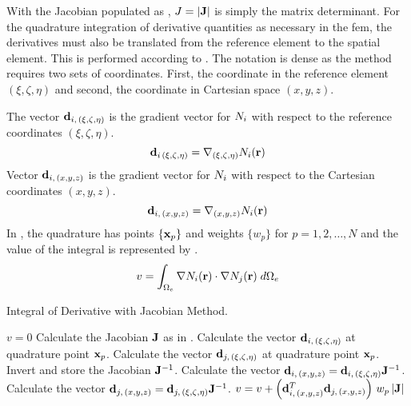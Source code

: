     With the Jacobian populated as , $J=\lvert\mathbf{J}\rvert$
    is simply the matrix determinant. For the quadrature integration of 
    derivative quantities as necessary in the \gls{fem}, the derivatives must 
    also be translated from the reference element to the spatial element. This 
    is performed according to . The notation 
    is dense as the method requires two sets of coordinates. First, the 
    coordinate in the reference element $(\xi,\zeta,\eta)$ and second, the 
    coordinate in Cartesian space $(x,y,z)$.

    The vector $\mathbf{d}_{i,\,(\xi,\zeta,\eta)}$ is the gradient vector for
    $N_i$ with respect to the reference coordinates $(\xi,\zeta,\eta)$.
    \begin{equation}
      \mathbf{d}_{i\,(\xi,\zeta,\eta)} = \mathbf{\nabla}_{(\xi,\zeta,\eta)} N_i(\mathbf{r}) 
    \end{equation}
    Vector $\mathbf{d}_{i,\,(x,y,z)}$ is the gradient vector for $N_i$ with
    respect to the Cartesian coordinates $(x,y,z)$. 
    \begin{equation}
      \mathbf{d}_{i,\,(x,y,z)} = \mathbf{\nabla}_{(x,y,z)} N_i(\mathbf{r})
    \end{equation}
    In , the quadrature has points $\{\mathbf{x}_p\}$ 
    and weights $\{w_p\}$ for $p = 1,2,\ldots,N$ and the value of the integral
    is represented by .
    \begin{equation}
      \label{eq:deriv_integral}
      v = \int_{\Omega_e} \mathbf{\nabla} N_i(\mathbf{r}) \cdot \mathbf{\nabla} N_j(\mathbf{r}) \;
        d\Omega_e
    \end{equation}

    \begin{algorithm}
      \caption{Integral of Derivative with Jacobian Method.}
      \label{algorithm:deriv_int}
      \begin{algorithmic}[1]
        \State $v=0$
          \State Calculate the Jacobian $\mathbf{J}$ as in .
          \State Calculate the vector $\mathbf{d}_{i,\,(\xi,\zeta,\eta)}$ at quadrature
            point $\mathbf{x}_p$.
          \State Calculate the vector $\mathbf{d}_{j,\,(\xi,\zeta,\eta)}$ at quadrature
            point $\mathbf{x}_p$.
          \State Invert and store the Jacobian $\mathbf{J}^{-1}$.
          \State Calculate the vector $\mathbf{d}_{i,\,(x,y,z)} =
            \mathbf{d}_{i,\,(\xi,\zeta,\eta)} \mathbf{J}^{-1}$.
          \State Calculate the vector $\mathbf{d}_{j,\,(x,y,z)} =
            \mathbf{d}_{j,\,(\xi,\zeta,\eta)} \mathbf{J}^{-1}$.
          \State $v = v + \left(\mathbf{d}_{i,\,(x,y,z)}^{T} \mathbf{d}_{j,\,(x,y,z)}\right)
            \, w_p \, \lvert \mathbf{J} \rvert$
        \EndFor
      \end{algorithmic}
    \end{algorithm}

